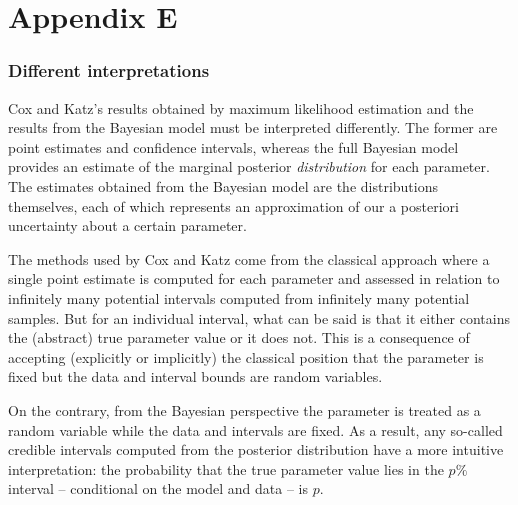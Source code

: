 \chapter*{Appendix E}\label{AppendixE}
\vspace{-1.75cm}
\subsection{Different interpretations}

Cox and Katz's results obtained by maximum likelihood estimation 
and the results from the Bayesian model must be interpreted differently. The former are point estimates 
and confidence intervals, whereas the full Bayesian model provides an estimate of the marginal posterior 
{\it distribution} for each parameter. The estimates obtained from the Bayesian model are the 
distributions themselves, each of which represents an approximation of our a posteriori
uncertainty about a certain parameter. 

The methods used by Cox and Katz come from the classical approach where a single point 
estimate is computed for each parameter and assessed in relation to infinitely many potential 
intervals computed from infinitely many potential samples. %
But for an individual interval,
what can be said is that it either contains the (abstract) true parameter value or it does not. This is 
a consequence of accepting (explicitly or implicitly) the classical position that the parameter is fixed 
but the data and interval bounds are random variables. 

On the contrary, from the Bayesian perspective the parameter is treated as a random variable while 
the data and intervals are fixed. As a result, any so-called credible intervals computed from the 
posterior distribution have a more intuitive interpretation: the probability that the true parameter value lies 
in the $p\%$ interval  -- conditional on the model and data -- is $p$. 

